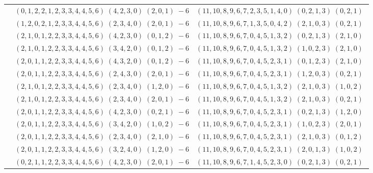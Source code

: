 \documentclass[11pt]{article}
\begin{document}
\begin{longtable}[l]{|c|c|c|}
 \cline{2-3} 
 & $(0 ,1 ,2 ,2 ,1 ,2 ,3 ,3 ,4 ,4 ,5 ,6) \;(4 ,2 ,3 ,0) \;(2 ,0 ,1) \;-6$ & $(11 ,10 ,8 ,9 ,6 ,7 ,2 ,3 ,5 ,1 ,4 ,0) \;(0 ,2 ,1 ,3) \;(0 ,2 ,1) \;$\\ 
 \cline{2-3} 
 & $(1 ,2 ,0 ,2 ,1 ,2 ,3 ,3 ,4 ,4 ,5 ,6) \;(2 ,3 ,4 ,0) \;(2 ,0 ,1) \;-6$ & $(11 ,10 ,8 ,9 ,6 ,7 ,1 ,3 ,5 ,0 ,4 ,2) \;(2 ,1 ,0 ,3) \;(0 ,2 ,1) \;$\\ 
 \cline{2-3} 
 & $(2 ,1 ,0 ,1 ,2 ,2 ,3 ,3 ,4 ,4 ,5 ,6) \;(4 ,2 ,3 ,0) \;(0 ,1 ,2) \;-6$ & $(11 ,10 ,8 ,9 ,6 ,7 ,0 ,4 ,5 ,1 ,3 ,2) \;(0 ,2 ,1 ,3) \;(2 ,1 ,0) \;$\\ 
 \cline{2-3} 
 & $(2 ,1 ,0 ,1 ,2 ,2 ,3 ,3 ,4 ,4 ,5 ,6) \;(3 ,4 ,2 ,0) \;(0 ,1 ,2) \;-6$ & $(11 ,10 ,8 ,9 ,6 ,7 ,0 ,4 ,5 ,1 ,3 ,2) \;(1 ,0 ,2 ,3) \;(2 ,1 ,0) \;$\\ 
 \cline{2-3} 
 & $(2 ,0 ,1 ,1 ,2 ,2 ,3 ,3 ,4 ,4 ,5 ,6) \;(4 ,3 ,2 ,0) \;(0 ,1 ,2) \;-6$ & $(11 ,10 ,8 ,9 ,6 ,7 ,0 ,4 ,5 ,2 ,3 ,1) \;(0 ,1 ,2 ,3) \;(2 ,1 ,0) \;$\\ 
 \cline{2-3} 
 & $(2 ,0 ,1 ,1 ,2 ,2 ,3 ,3 ,4 ,4 ,5 ,6) \;(2 ,4 ,3 ,0) \;(2 ,0 ,1) \;-6$ & $(11 ,10 ,8 ,9 ,6 ,7 ,0 ,4 ,5 ,2 ,3 ,1) \;(1 ,2 ,0 ,3) \;(0 ,2 ,1) \;$\\ 
 \cline{2-3} 
 & $(2 ,1 ,0 ,1 ,2 ,2 ,3 ,3 ,4 ,4 ,5 ,6) \;(2 ,3 ,4 ,0) \;(1 ,2 ,0) \;-6$ & $(11 ,10 ,8 ,9 ,6 ,7 ,0 ,4 ,5 ,1 ,3 ,2) \;(2 ,1 ,0 ,3) \;(1 ,0 ,2) \;$\\ 
 \cline{2-3} 
 & $(2 ,1 ,0 ,1 ,2 ,2 ,3 ,3 ,4 ,4 ,5 ,6) \;(2 ,3 ,4 ,0) \;(2 ,0 ,1) \;-6$ & $(11 ,10 ,8 ,9 ,6 ,7 ,0 ,4 ,5 ,1 ,3 ,2) \;(2 ,1 ,0 ,3) \;(0 ,2 ,1) \;$\\ 
 \cline{2-3} 
 & $(2 ,0 ,1 ,1 ,2 ,2 ,3 ,3 ,4 ,4 ,5 ,6) \;(4 ,2 ,3 ,0) \;(0 ,2 ,1) \;-6$ & $(11 ,10 ,8 ,9 ,6 ,7 ,0 ,4 ,5 ,2 ,3 ,1) \;(0 ,2 ,1 ,3) \;(1 ,2 ,0) \;$\\ 
 \cline{2-3} 
 & $(2 ,0 ,1 ,1 ,2 ,2 ,3 ,3 ,4 ,4 ,5 ,6) \;(3 ,4 ,2 ,0) \;(1 ,0 ,2) \;-6$ & $(11 ,10 ,8 ,9 ,6 ,7 ,0 ,4 ,5 ,2 ,3 ,1) \;(1 ,0 ,2 ,3) \;(2 ,0 ,1) \;$\\ 
 \cline{2-3} 
 & $(2 ,0 ,1 ,1 ,2 ,2 ,3 ,3 ,4 ,4 ,5 ,6) \;(2 ,3 ,4 ,0) \;(2 ,1 ,0) \;-6$ & $(11 ,10 ,8 ,9 ,6 ,7 ,0 ,4 ,5 ,2 ,3 ,1) \;(2 ,1 ,0 ,3) \;(0 ,1 ,2) \;$\\ 
 \cline{2-3} 
 & $(2 ,0 ,1 ,1 ,2 ,2 ,3 ,3 ,4 ,4 ,5 ,6) \;(3 ,2 ,4 ,0) \;(1 ,2 ,0) \;-6$ & $(11 ,10 ,8 ,9 ,6 ,7 ,0 ,4 ,5 ,2 ,3 ,1) \;(2 ,0 ,1 ,3) \;(1 ,0 ,2) \;$\\ 
 \cline{2-3} 
 & $(0 ,2 ,1 ,1 ,2 ,2 ,3 ,3 ,4 ,4 ,5 ,6) \;(4 ,2 ,3 ,0) \;(2 ,0 ,1) \;-6$ & $(11 ,10 ,8 ,9 ,6 ,7 ,1 ,4 ,5 ,2 ,3 ,0) \;(0 ,2 ,1 ,3) \;(0 ,2 ,1) \;$\\ 

\end{longtable}
\end{document}
